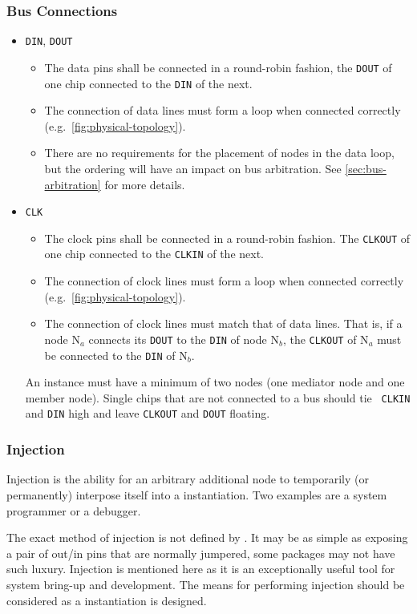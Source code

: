 \subsubsection{Bus Connections}
\label{sec:physical-bus}
\begin{itemize}
  \item {\tt DIN}, {\tt DOUT}
  \begin{itemize}
    \item The data pins shall be connected in a round-robin fashion, the
      {\tt DOUT} of one chip connected to the {\tt DIN} of the next.
    \item The connection of data lines must form a loop when connected
      correctly (e.g.~\cref{fig:physical-topology}).
    \item There are no requirements for the placement of nodes in the data
      loop, but the ordering will have an impact on bus arbitration. See
      \cref{sec:bus-arbitration} for more details.
  \end{itemize}
  \item {\tt CLK}
  \begin{itemize}
    \item The clock pins shall be connected in a round-robin fashion. The
      {\tt CLKOUT} of one chip connected to the {\tt CLKIN} of the next.
    \item The connection of clock lines must form a loop when connected
      correctly (e.g.~\cref{fig:physical-topology}).
    \item The connection of clock lines must match that of data lines. That
      is, if a node N$_{a}$ connects its {\tt DOUT} to the {\tt DIN} of node
      N$_{b}$, the {\tt CLKOUT} of N$_{a}$ must be connected to the {\tt DIN}
      of N$_{b}$.
  \end{itemize}
  An \bus instance must have a minimum of two nodes (one mediator node and one
  member node). Single chips that are not connected to a bus should tie {\tt
  CLKIN} and {\tt DIN} high and leave {\tt CLKOUT} and {\tt DOUT} floating.
\end{itemize}


\subsubsection{Injection}
Injection is the ability for an arbitrary additional node to temporarily (or
permanently) interpose itself into a \bus instantiation. Two examples are a
system programmer or a debugger.

The exact method of injection is not defined by \bus. It may be as simple as
exposing a pair of out/in pins that are normally jumpered, some packages may
not have such luxury. Injection is mentioned here as it is an exceptionally
useful tool for system bring-up and development. The means for performing
injection should be considered as a \bus instantiation is designed.

